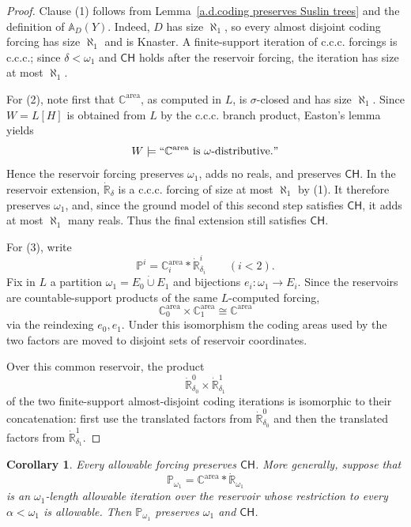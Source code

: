 \documentclass[a4paper,11pt]{article}
\newtheorem{corollary}[theorem]{Corollary}
\newcommand{\forceP}{\mathbb{P}}
\newcommand{\forceR}{\mathbb{R}}
\newcommand{\forceC}{\mathbb{C}}
\newcommand{\CH}{\mathsf{CH}}
\begin{document}
\begin{proof}
Clause (1) follows from Lemma~\ref{a.d.coding preserves Suslin trees} and the
definition of $\mathbb A_D(Y)$.  Indeed, $D$ has size $\aleph_1$, so every
almost disjoint coding forcing has size $\aleph_1$ and is Knaster.  A
finite-support iteration of c.c.c. forcings is c.c.c.; since
$\delta<\omega_1$ and $\CH$ holds after the reservoir forcing, the iteration
has size at most $\aleph_1$.

For (2), note first that $\forceC^{\mathrm{area}}$, as computed in $L$, is
$\sigma$-closed and has size $\aleph_1$.  Since $W=L[H]$ is obtained from $L$
by the c.c.c. branch product, Easton's lemma yields
\[
   W\models
   ``\forceC^{\mathrm{area}}\text{ is }\omega\text{-distributive}."
\]
Hence the reservoir forcing preserves $\omega_1$, adds no reals, and preserves
$\CH$.  In the reservoir extension, $\dot{\forceR}_\delta$ is a c.c.c.
forcing of size at most $\aleph_1$ by (1).  It therefore preserves
$\omega_1$, and, since the ground model of this second step satisfies $\CH$,
it adds at most $\aleph_1$ many reals.  Thus the final extension still
satisfies $\CH$.

For (3), write
\[
   \forceP^i
   =\forceC_i^{\mathrm{area}}*\dot{\forceR}^{i}_{\delta_i}
   \qquad(i<2).
\]
Fix in $L$ a partition $\omega_1=E_0\mathbin{\dot\cup}E_1$ and bijections
$e_i:\omega_1\longrightarrow E_i$.  Since the reservoirs are countable-support
products of the same $L$-computed forcing,
\[
   \forceC_0^{\mathrm{area}}\times\forceC_1^{\mathrm{area}}
   \cong\forceC^{\mathrm{area}}
\]
via the reindexing $e_0,e_1$.  Under this isomorphism the coding areas used by
the two factors are moved to disjoint sets of reservoir coordinates.

Over this common reservoir, the product
\[
   \dot{\forceR}^{0}_{\delta_0}	\times
   \dot{\forceR}^{1}_{\delta_1}
\]
of the two finite-support almost-disjoint coding iterations is isomorphic to
their concatenation: first use the translated factors from
$\dot{\forceR}^{0}_{\delta_0}$ and then the translated factors from
$\dot{\forceR}^{1}_{\delta_1}$.  
\end{proof}

\begin{corollary}\label{allowable-forcings-preserve-ch}
Every allowable forcing preserves $\CH$.  More generally, suppose that
\[
   \forceP_{\omega_1}
   =\forceC^{\mathrm{area}}*\dot{\forceR}_{\omega_1}
\]
is an $\omega_1$-length allowable iteration over the reservoir whose restriction to every
$\alpha<\omega_1$ is allowable.  Then $\forceP_{\omega_1}$ preserves
$\omega_1$ and $\CH$.
\end{corollary}
\end{document}

